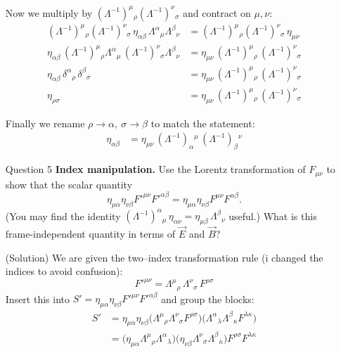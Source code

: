 \documentclass[12pt]{article}
\begin{document}
\begin{enumerate}
  Now we multiply by $(\Lambda^{-1})^{\mu}{}_{\rho}(\Lambda^{-1})^{\nu}{}_{\sigma}$ and contract on $\mu,\nu$:  
  \[
  \begin{aligned}
  (\Lambda^{-1})^{\mu}{}_{\rho}(\Lambda^{-1})^{\nu}{}_{\sigma}\,\eta_{\alpha\beta}\,\Lambda^{\alpha}{}_{\mu}\Lambda^{\beta}{}_{\nu}
  &=(\Lambda^{-1})^{\mu}{}_{\rho}(\Lambda^{-1})^{\nu}{}_{\sigma}\,\eta_{\mu\nu}\\[4pt]
  \eta_{\alpha\beta}\,(\Lambda^{-1})^{\mu}{}_{\rho}\Lambda^{\alpha}{}_{\mu}\,
  (\Lambda^{-1})^{\nu}{}_{\sigma}\Lambda^{\beta}{}_{\nu}
  &=\eta_{\mu\nu}\,(\Lambda^{-1})^{\mu}{}_{\rho}\,(\Lambda^{-1})^{\nu}{}_{\sigma}\\[4pt]
  \eta_{\alpha\beta}\,\delta^{\alpha}{}_{\rho}\,\delta^{\beta}{}_{\sigma}
  &=\eta_{\mu\nu}\,(\Lambda^{-1})^{\mu}{}_{\rho}\,(\Lambda^{-1})^{\nu}{}_{\sigma}\\[4pt]
  \eta_{\rho\sigma}
  &=\eta_{\mu\nu}\,(\Lambda^{-1})^{\mu}{}_{\rho}\,(\Lambda^{-1})^{\nu}{}_{\sigma}
  \end{aligned}
  \]
  
  Finally we rename $\rho\to\alpha,\ \sigma\to\beta$ to match the statement:
  \[
  \begin{aligned}
  \eta_{\alpha\beta}
  &=\eta_{\mu\nu}\,(\Lambda^{-1})_{\alpha}{}^{\mu}\,(\Lambda^{-1})_{\beta}{}^{\nu}
  \end{aligned}
  \]
  
  



  \newpage



  \item[Question 5] \textbf{Index manipulation.} Use the Lorentz transformation of $F_{\mu\nu}$ to show that the scalar quantity
  \[
    \eta_{\mu\alpha}\eta_{\nu\beta}F'^{\mu\nu}F'^{\alpha\beta} = \eta_{\mu\alpha}\eta_{\nu\beta}F^{\mu\nu}F^{\alpha\beta}.
  \]
  (You may find the identity $(\Lambda^{-1})^{\alpha}{}_{\mu}\,\eta_{\alpha\nu}=\eta_{\mu\beta}\,\Lambda^{\beta}{}_{\nu}$ useful.) What is this frame-independent quantity in terms of $\vec E$ and $\vec B$?

  
  \item[(Solution)] We are given the two–index transformation rule (i changed the indices to avoid confusion):
  \[
  F'^{\mu\nu}=\Lambda^{\mu}{}_{\rho}\,\Lambda^{\nu}{}_{\sigma}\,F^{\rho\sigma}
  \]
  Insert this into $S'=\eta_{\mu\alpha}\eta_{\nu\beta}F'^{\mu\nu}F'^{\alpha\beta}$ and group the blocks:
  \[
  \begin{aligned}
  S'
  &=\eta_{\mu\alpha}\eta_{\nu\beta}
  \bigl(\Lambda^{\mu}{}_{\rho}\Lambda^{\nu}{}_{\sigma}F^{\rho\sigma}\bigr)
  \bigl(\Lambda^{\alpha}{}_{\lambda}\Lambda^{\beta}{}_{\kappa}F^{\lambda\kappa}\bigr)\\
  &=\bigl(\eta_{\mu\alpha}\Lambda^{\mu}{}_{\rho}\Lambda^{\alpha}{}_{\lambda}\bigr)
    \bigl(\eta_{\nu\beta}\Lambda^{\nu}{}_{\sigma}\Lambda^{\beta}{}_{\kappa}\bigr)
    F^{\rho\sigma}F^{\lambda\kappa}
  \end{aligned}
  \]
  

\end{enumerate}
\end{document}
